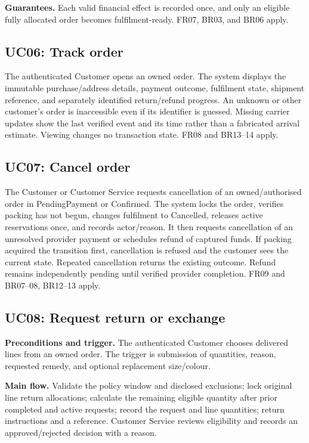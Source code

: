\textbf{Guarantees.} Each valid financial effect is recorded once, and only an eligible fully allocated order becomes fulfilment-ready. FR07, BR03, and BR06 apply.

\subsection{UC06: Track order}
The authenticated Customer opens an owned order. The system displays the immutable purchase/address details, payment outcome, fulfilment state, shipment reference, and separately identified return/refund progress. An unknown or other customer's order is inaccessible even if its identifier is guessed. Missing carrier updates show the last verified event and its time rather than a fabricated arrival estimate. Viewing changes no transaction state. FR08 and BR13--14 apply.

\subsection{UC07: Cancel order}
The Customer or Customer Service requests cancellation of an owned/authorised order in PendingPayment or Confirmed. The system locks the order, verifies packing has not begun, changes fulfilment to Cancelled, releases active reservations once, and records actor/reason. It then requests cancellation of an unresolved provider payment or schedules refund of captured funds. If packing acquired the transition first, cancellation is refused and the customer sees the current state. Repeated cancellation returns the existing outcome. Refund remains independently pending until verified provider completion. FR09 and BR07--08, BR12--13 apply.

\subsection{UC08: Request return or exchange}
\textbf{Preconditions and trigger.} The authenticated Customer chooses delivered lines from an owned order. The trigger is submission of quantities, reason, requested remedy, and optional replacement size/colour.

\textbf{Main flow.} Validate the policy window and disclosed exclusions; lock original line return allocations; calculate the remaining eligible quantity after prior completed and active requests; record the request and line quantities; return instructions and a reference. Customer Service reviews eligibility and records an approved/rejected decision with a reason.

